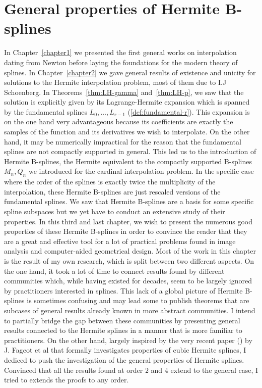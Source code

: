 \chapter{General properties of Hermite B-splines}\label{chapter3}

In Chapter~\ref{chapter1} we presented the first general works on interpolation dating from Newton before laying the 
foundations for the modern theory of splines. In Chapter~\ref{chapter2} we gave general results of existence and unicity 
for solutions to the Hermite interpolation problem, most of them due to I.J Schoenberg. In Theorems~\ref{thm:LH-gamma} 
and~\ref{thm:LH-p}, we saw that the solution is explicitly given by its Lagrange-Hermite expansion which is spanned by 
the fundamental splines $L_0, \ldots, L_{r-1}$ (\ref{def:fundamental-r}). This expansion is on the one hand very 
advantageous because its coefficients are exactly the samples of the function and its derivatives we wish to 
interpolate. On the other hand, it may be numerically impractical for the reason that the fundamental splines are not 
compactly supported in general. This led us to the introduction of Hermite B-splines, the Hermite equivalent to the 
compactly supported B-splines $M_n, Q_n$ we introduced for the cardinal interpolation problem. In the specific case 
where the order of the splines is exactly twice the multiplicity of the interpolation, these Hermite B-splines are just 
rescaled versions of the fundamental splines. We saw that Hermite B-splines are a basis for some specific spline 
subspaces but we yet have to conduct an extensive study of their properties. In this third and last chapter, we wish to 
present the numerous good properties of these Hermite B-splines in order to convince the reader that they are a great 
and effective tool for a lot of practical problems found in image analysis and computer-aided geometrical design. Most 
of the work in this chapter is the result of my own research, which is split between two different aspects. On the one 
hand, it took a lot of time to connect results found by different communities which, while having existed for decades, 
seem to be largely ignored by practitioners interested in splines. This lack of a global picture of Hermite B-splines is 
sometimes confusing and may lead some to publish theorems that are subcases of general results already known in more 
abstract communities. I intend to partially bridge the gap between these communities by presenting general results 
connected to the Hermite splines in a manner that is more familiar to practitioners. On the other hand, largely inspired 
by the very recent paper (\cite{FAUU19}) by J. Fageot et al that formally investigates properties of cubic Hermite 
splines, I dediced to push the investigation of the general properties of Hermite splines. Convinced that all the 
results found at order $2$ and $4$ extend to the general case, I tried to extends the proofs to any order. 

